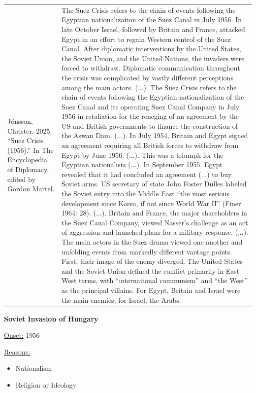{\begin{longtable}{p{}p{}}
Jönsson, Christer. 2025. “Suez Crisis (1956).” In The Encyclopedia of Diplomacy, edited by Gordon Martel. & The Suez Crisis refers to the chain of events following the Egyptian nationalization of the Suez Canal in July 1956. In late October Israel, followed by Britain and France, attacked Egypt in an effort to regain Western control of the Suez Canal. After diplomatic interventions by the United States, the Soviet Union, and the United Nations, the invaders were forced to withdraw. Diplomatic communication throughout the crisis was complicated by vastly different perceptions among the main actors. (...). The Suez Crisis refers to the chain of events following the Egyptian nationalization of the Suez Canal and its operating Suez Canal Company in July 1956 in retaliation for the reneging of an agreement by the US and British governments to finance the construction of the Aswan Dam. (...).
In July 1954, Britain and Egypt signed an agreement requiring all British forces to withdraw from Egypt by June 1956. (...). This was a triumph for the Egyptian nationalists (...). In September 1955, Egypt revealed that it had concluded an agreement (...) to buy Soviet arms. US secretary of state John Foster Dulles labeled the Soviet entry into the Middle East “the most serious development since Korea, if not since World War II” (Finer 1964: 28). (...). Britain and France, the major shareholders in the Suez Canal Company, viewed Nasser's challenge as an act of aggression and launched plans for a military response. (...).
The main actors in the Suez drama viewed one another and unfolding events from markedly different vantage points. First, their image of the enemy diverged. The United States and the Soviet Union defined the conflict primarily in East–West terms, with “international communism” and “the West” as the principal villains. For Egypt, Britain and Israel were the main enemies; for Israel, the Arabs.
\\
\end{longtable}}
\clearpage
         \textbf{Soviet Invasion of Hungary} 

          \underline{Onset:} 1956         

\underline{Reasons:}
\begin{itemize}
\item Nationalism
\item Religion or Ideology
\end{itemize}

